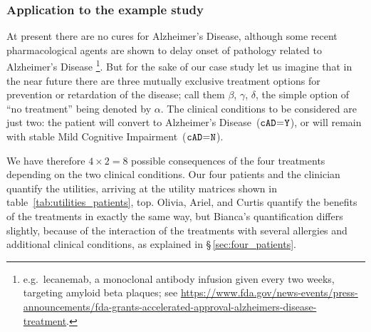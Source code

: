 \documentclass[a4paper,12pt,%
onecolumn,oneside,article,%
british%
]{memoir}
\theoremstyle{remark}
\theoremstyle{innote}
\renewcommand*{\|}[1][]{\nonscript\:#1\vert\nonscript\:\mathopen{}}
\newcommand*{\mo}[1][=]{\mathclose{}\mathord{\nonscript\mkern0.5mu#1\nonscript\mkern0.5mu}\mathopen{}}
\newcommand*{\sect}{\S}%
\newcommand*{\eg}{{e.g.}}
\newcommand*{\cad}{\texttt{cAD}}
\newcommand*{\yes}{\texttt{Y}}
\newcommand*{\no}{\texttt{N}}
\newcommand*{\ad}{Alzheimer's Disease}
\newcommand*{\mci}{Mild Cognitive Impairment}
\begin{document}
\subsubsection{Application to the example study}
\label{sec:expected_utility_application}

At present there are no cures for \ad, although some recent pharmacological agents are shown to delay onset of pathology related to \ad%
\footnote{\eg\ lecanemab, a monoclonal antibody infusion given every two weeks, targeting amyloid beta plaques; see \url{https://www.fda.gov/news-events/press-announcements/fda-grants-accelerated-approval-alzheimers-disease-treatment}.}. But for the sake of our case study let us imagine that in the near future there are three mutually exclusive treatment options for prevention or retardation of the disease; call them $\beta$, $\gamma$, $\delta$, the simple option of \enquote{no treatment} being denoted by $\alpha$. The clinical conditions to be considered are just two: the patient will convert to \ad\ ($\cad\mo\yes$), or will remain with stable \mci\ ($\cad\mo\no$).

We have therefore $4 \times 2 = 8$ possible consequences of the four treatments depending on the two clinical conditions. Our four patients and the clinician quantify the utilities, arriving at the utility matrices shown in table~\ref{tab:utilities_patients}, top. Olivia, Ariel, and Curtis quantify the benefits of the treatments in exactly the same way, but Bianca's quantification differs slightly, because of the interaction of the treatments with several allergies and additional clinical conditions, as explained in \sect\,\ref{sec:four_patients}.
\end{document}
